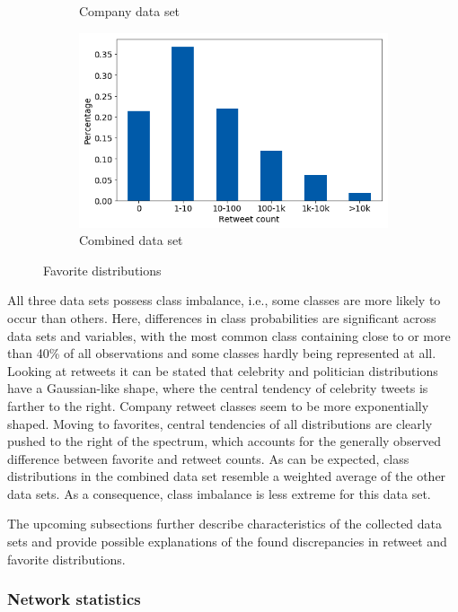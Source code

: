 \begin{figure}[h]
\begin{subfigure}{.45\textwidth}
  \caption{Company data set}
  \label{fig:fav_distr_sub3}
\end{subfigure}%
\begin{subfigure}{.45\textwidth}
  \centering
  \includegraphics[width=.95\linewidth]{img/comb_fav_distr}
  \caption{Combined data set}
  \label{fig:fav_distr_sub4}
\end{subfigure}%
\caption{Favorite distributions}
\label{fig:fav_distr}
\end{figure}

All three data sets possess class imbalance, i.e., some classes are more likely
to occur than others.
Here, differences in class probabilities are significant across data sets
and variables, with the most common class
containing close to or more than 40\% of all observations and some classes
hardly being represented at all.
Looking at retweets it can be stated that celebrity and politician distributions
have a Gaussian-like shape, where the central tendency of celebrity tweets is
farther to the right.
Company retweet classes seem to be more exponentially shaped.
Moving to favorites, central tendencies of all distributions are clearly pushed to the right of the
spectrum, which accounts for the generally observed difference between favorite
and retweet counts.
As can be expected, class distributions in the combined data set resemble a
weighted average of the other data sets.
As a consequence, class imbalance is less extreme for this data set.

The upcoming subsections further describe characteristics of the collected
data sets and provide possible explanations of the found discrepancies in
retweet and favorite distributions.

\subsubsection{Network statistics}
\label{sec:network_stats}

